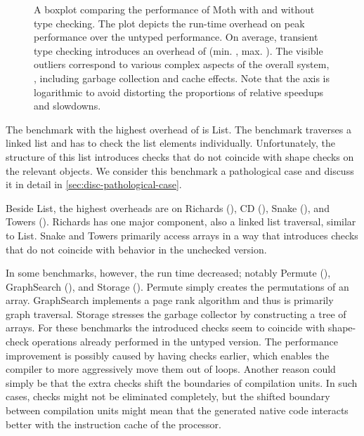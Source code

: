\begin{figure}[htb]
  \centering
	\TypingOverhead{}
	\caption{A boxplot comparing the performance of Moth
  with and without type checking.
  The plot depicts the run-time overhead on peak performance over
  the untyped performance. On average, transient type checking introduces
  an overhead of \OverheadTypingGMeanP (min. \OverheadTypingMinP, max. \OverheadTypingMaxP).
  The visible outliers correspond to various complex aspects of the overall
  system, \eg, including garbage collection and cache effects.
  Note that the axis is logarithmic to avoid distorting the proportions
  of relative speedups and slowdowns.}
	\label{fig:typing-overhead}
\end{figure}


The benchmark with the highest overhead of \OverheadListP is List.
The benchmark traverses a linked list and
has to check the list elements individually.
Unfortunately, the structure of this list introduces checks
that do not coincide with shape checks on the relevant objects.
We consider this benchmark a pathological case and discuss it
in detail in \cref{sec:disc-pathological-case}.

Beside List, the highest overheads are on
Richards (\OverheadRichardsP), CD (\OverheadCDP),
Snake (\OverheadSnakeP), and Towers (\OverheadTowersP).
Richards has one major component, also a linked list traversal,
similar to List.
Snake and Towers primarily access arrays in a way that introduces checks
that do not coincide with behavior in the unchecked version.


In some benchmarks, however, the run time decreased; notably Permute (\OverheadPermuteP),
GraphSearch (\OverheadGraphSearchP), and Storage (\OverheadStorageP).
Permute simply creates the permutations of an array.
GraphSearch implements a page rank algorithm
and thus is primarily graph traversal.
Storage stresses the garbage collector by constructing a tree of arrays.
For these benchmarks the introduced checks seem to coincide with shape-check operations
already performed in the untyped version.
The performance improvement is possibly caused by having checks earlier,
which enables the compiler to more aggressively move them out of loops.
Another reason could simply be that the extra checks shift the boundaries
of compilation units.
In such cases, checks might not be eliminated completely,
but the shifted boundary between compilation units might mean that
the generated native code interacts better with
the instruction cache of the processor.

